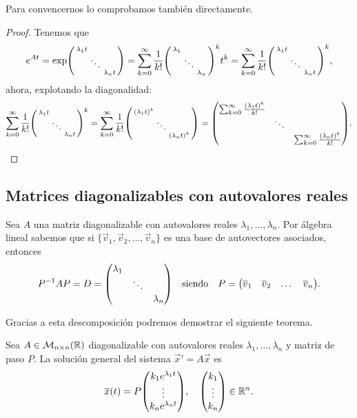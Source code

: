 \documentclass[../ecuaciones_diferenciales.tex]{subfiles}
\begin{document}
Para convencernos lo comprobamos también directamente.

\begin{proof}
	Tenemos que
	\[e^{At} = \exp\smat{\lambda_1t & & \\ & \ddots & \\ & & \lambda_nt}
		= \sum_{k = 0}^\infty
		\frac{1}{k!}\smat{\lambda_1 & & \\ & \ddots & \\ & & \lambda_n}^k t^k
		= \sum_{k = 0}^\infty
		\frac{1}{k!} \smat{\lambda_1 t & & \\ & \ddots & \\ & & \lambda_n t}^k,
	\]
	ahora, explotando la diagonalidad:
	\[\sum_{k = 0}^\infty \frac{1}{k!} 
			\smat{\lambda_1 t & & \\ & \ddots & \\ & & \lambda_n t}^k
		= \sum_{k = 0}^\infty \frac{1}{k!} 
			\smat{(\lambda_1 t)^k & & \\ & \ddots & \\ & & (\lambda_n t)^k}
		= \mat{\sum_{k = 0}^\infty \frac{(\lambda_1 t)^k}{k!} & & \\
			& \ddots &
			\\ & & \sum_{k = 0}^\infty \frac{(\lambda_n t)^k}{k!}}.\]
\end{proof}

\subsection{Matrices diagonalizables con autovalores reales}

Sea \(A\) una matriz diagonalizable con autovalores reales
\(\lambda_1, \dots, \lambda_n\). 
Por álgebra lineal sabemos que si \(\{\vec{v}_1, \vec{v}_2, \dots, \vec{v}_n\}\)
es una base de autovectores asociados, entonces
\[P^{-1} A P = D = \mat{\lambda_1 && \\ & \ddots & \\ && \lambda_n}
	\quad \text{siendo} \quad
	P = \mat{\vec{v}_1 & \vec{v}_2 & \dots & \vec{v}_n}.\]

Gracias a esta descomposición podremos demostrar el siguiente teorema.

\begin{proposition}
    Sea \(A \in \mathcal{M}_{n \times n}(\mathbb{R})\) diagonalizable con autovalores
    reales \(\lambda_1, \dots, \lambda_n\) y matriz de paso \(P\). La
    solución general del sistema \(\vec{x}' = A\vec{x}\) es
	\[\vec{x}(t) = P\mat{k_1 e^{\lambda_1 t} \\ \vdots \\ k_n e^{\lambda_n t}},
	\quad \mat{k_1 \\ \vdots \\ k_n} \in \R^n.\]
\end{proposition}
\end{document}
